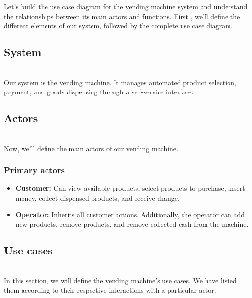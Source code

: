 

Let's build the use case diagram for the vending machine system and understand the relationships between its main actors and functions. First , we'll define the different elements of our system, followed by the complete use case diagram.

\subsection{System}\label{mp5h7PwOvSSW-z-hVU5e6}
\\
Our system is the vending machine. It manages automated product selection, payment, and goods dispensing through a self-service interface.

\subsection{Actors}\label{qJ2IsbfhPf2tTcj_ECpmY}
\\
Now, we'll define the main actors of our vending machine.

\subsubsection{Primary actors}\label{g466Vg-Wbx3lP0J--86x8}

\begin{itemize}
\item
\protect{}\label{ZngmkXn3uJ3ToILiz7xjx}
\textbf{Customer:} Can view available products, select products to purchase, insert money, collect dispensed products, and receive change.
\item
\protect{}\label{ipcZbF6rg_GVQH-rIDl99}
\textbf{Operator:} Inherits all customer actions. Additionally, the operator can add new products, remove products, and remove collected cash from the machine.
\end{itemize}

\subsection{Use cases}\label{vBJvd8FLO41o8l7DCLEfR}
\\
In this section, we will define the vending machine's use cases. We have listed them according to their respective interactions with a particular actor.

